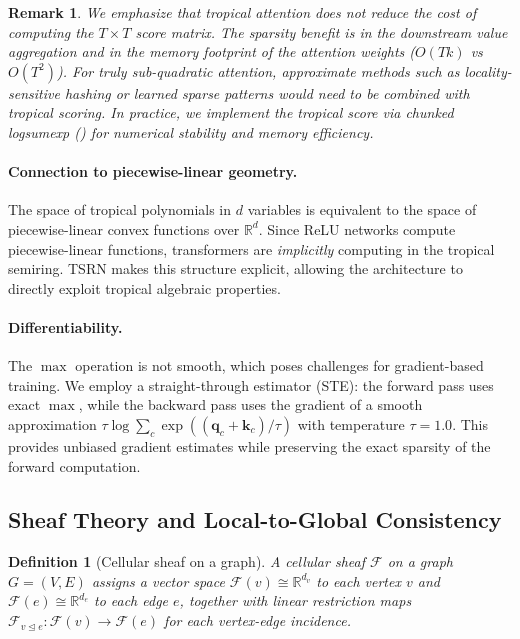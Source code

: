 \documentclass[11pt,a4paper]{article}
\newtheorem{definition}[theorem]{Definition}
\newtheorem{remark}[theorem]{Remark}
\newcommand{\R}{\mathbb{R}}
\begin{document}
\begin{remark}
We emphasize that tropical attention does \emph{not} reduce the
cost of computing the $T \times T$ score matrix.  The sparsity
benefit is in the downstream value aggregation and in the
memory footprint of the attention weights ($O(Tk)$ vs $O(T^2)$).
For truly sub-quadratic attention, approximate methods such as
locality-sensitive hashing or learned sparse patterns would need
to be combined with tropical scoring.  In practice, we implement
the tropical score via chunked logsumexp () for
numerical stability and memory efficiency.
\end{remark}

\paragraph{Connection to piecewise-linear geometry.}
The space of tropical polynomials in $d$ variables is equivalent to
the space of piecewise-linear convex functions over $\R^d$.  Since
ReLU networks compute piecewise-linear functions, transformers are
\emph{implicitly} computing in the tropical semiring.  TSRN makes
this structure explicit, allowing the architecture to directly exploit
tropical algebraic properties.

\paragraph{Differentiability.}
The $\max$ operation is not smooth, which poses challenges for
gradient-based training.  We employ a straight-through estimator
(STE): the forward pass uses exact $\max$, while the backward pass
uses the gradient of a smooth approximation
$\tau \log \sum_c \exp((\bm{q}_c + \bm{k}_c)/\tau)$ with temperature
$\tau = 1.0$.  This provides unbiased gradient estimates while
preserving the exact sparsity of the forward computation.

\subsection{Sheaf Theory and Local-to-Global Consistency}
\label{sec:sheaf}

\begin{definition}[Cellular sheaf on a graph]
A \emph{cellular sheaf} $\mathcal{F}$ on a graph $G = (V, E)$ assigns
a vector space $\mathcal{F}(v) \cong \R^{d_v}$ to each vertex $v$ and
$\mathcal{F}(e) \cong \R^{d_e}$ to each edge $e$, together with
linear restriction maps $\mathcal{F}_{v \trianglelefteq e} :
\mathcal{F}(v) \to \mathcal{F}(e)$ for each vertex-edge incidence.
\end{definition}
\end{document}
